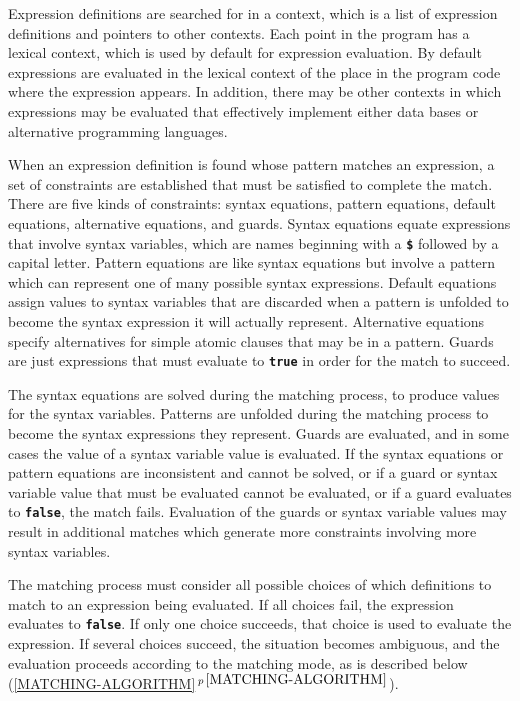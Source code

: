 \documentclass[12pt]{article}
\newcommand{\TT}[1]{{\tt \bfseries #1}}
\newcommand{\secref}[1]{\ref{#1}$\,^{p\,\pageref{#1}}$}
\begin{document}
Expression definitions are searched for in a context, which is a list
of expression definitions and pointers to other contexts.
Each point in the program has a lexical context, which is used by default
for expression evaluation. 
By default expressions are evaluated in the
lexical context of the place in the program code where the expression
appears.  In addition, there may be other
contexts in which expressions may be evaluated that effectively implement
either data bases or alternative programming languages.

When an expression definition is found whose pattern matches an expression,
a set of constraints are established that must be satisfied to
complete the match.  There are five kinds of constraints: syntax
equations, pattern equations, default equations, alternative
equations, and guards.
Syntax equations equate expressions that involve syntax variables,
which are names beginning with a \TT{\$} followed by a capital letter.
Pattern equations are like syntax equations but
involve a pattern which can represent one of many possible syntax
expressions.  Default equations assign values to syntax variables that are
discarded when a pattern is unfolded to become the syntax expression
it will actually represent.  Alternative equations specify alternatives
for simple atomic clauses that may be in a pattern.
Guards are just expressions that must evaluate to
\TT{true} in order for the match to succeed.

The syntax equations are solved during the matching process,
to produce values for the syntax variables.  Patterns are unfolded during
the matching process to become the syntax expressions they represent.
Guards are evaluated, and in some cases the value of a syntax variable
value is evaluated.
If the syntax equations or pattern equations are inconsistent and
cannot be solved, or if a guard or syntax variable value that must be
evaluated cannot be evaluated, or if a guard evaluates to \TT{false},
the match fails.  Evaluation of the guards or syntax variable values
may result in additional matches which generate more
constraints involving more syntax variables.

The matching process must consider all possible choices of which definitions
to match to an expression being evaluated.  If all choices fail, the
expression evaluates to \TT{false}.  If only one choice succeeds, that
choice is used to evaluate the expression.  If several choices succeed,
the situation becomes ambiguous, and the evaluation proceeds according
to the matching mode, as is described below
(\secref{MATCHING-ALGORITHM}).
\end{document}
